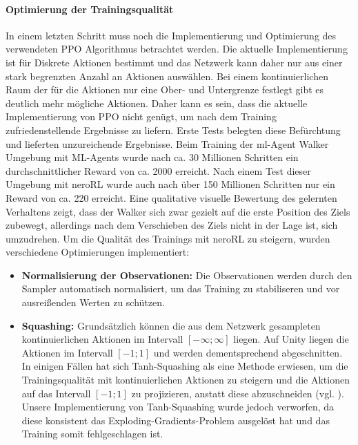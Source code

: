 \paragraph{Optimierung der Trainingsqualität}
In einem letzten Schritt muss noch die Implementierung und Optimierung des verwendeten PPO Algorithmus betrachtet werden. Die aktuelle Implementierung ist für Diskrete Aktionen bestimmt und das Netzwerk kann daher nur aus einer stark begrenzten Anzahl an Aktionen auswählen. Bei einem kontinuierlichen Raum der für die Aktionen nur eine Ober- und Untergrenze festlegt gibt es deutlich mehr mögliche Aktionen. Daher kann es sein, dass die aktuelle Implementierung von PPO nicht genügt, um nach dem Training zufriedenstellende Ergebnisse zu liefern. Erste Tests belegten diese Befürchtung und lieferten unzureichende Ergebnisse. Beim Training der ml-Agent Walker Umgebung mit ML-Agents wurde nach ca. 30 Millionen Schritten ein durchschnittlicher Reward von ca. 2000 erreicht. Nach einem Test dieser Umgebung mit neroRL wurde auch nach über 150 Millionen Schritten nur ein Reward von ca. 220 erreicht.
Eine qualitative visuelle Bewertung des gelernten Verhaltens zeigt, dass der Walker sich zwar gezielt auf die erste Position des Ziels zubewegt, allerdings nach dem Verschieben des Ziels nicht in der Lage ist, sich umzudrehen. 
Um die Qualität des Trainings mit neroRL zu steigern, wurden verschiedene Optimierungen implementiert:

\begin{itemize}
	\item \textbf{Normalisierung der Observationen:} Die Observationen werden durch den Sampler automatisch normalisiert, um das Training zu stabiliseren und vor ausreißenden Werten zu schützen.
	\item \textbf{Squashing:} Grundsätzlich können die aus dem Netzwerk gesampleten kontinuierlichen Aktionen im Intervall $[-\infty;\infty]$ liegen. Auf Unity liegen die Aktionen im Intervall $[-1;1]$ und werden dementsprechend abgeschnitten. In einigen Fällen hat sich Tanh-Squashing als eine Methode erwiesen, um die Trainingsqualität mit kontinuierlichen Aktionen zu steigern und die Aktionen auf das Intervall $[-1;1]$ zu projizieren, anstatt diese abzuschneiden (vgl. \cite{shengyi2022the37implementation}). Unsere Implementierung von Tanh-Squashing wurde jedoch verworfen, da diese konsistent das Exploding-Gradients-Problem ausgelöst hat und das Training somit fehlgeschlagen ist. 
\end{itemize}

